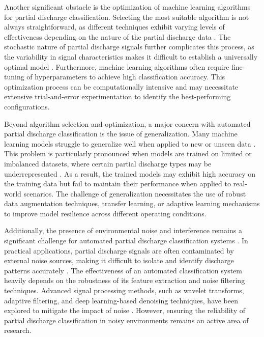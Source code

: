 Another significant obstacle is the optimization of machine learning algorithms for partial discharge classification. Selecting the most suitable algorithm is not always straightforward, as different techniques exhibit varying levels of effectiveness depending on the nature of the partial discharge data \parencite{Fei_2024}. The stochastic nature of partial discharge signals further complicates this process, as the variability in signal characteristics makes it difficult to establish a universally optimal model \parencite{Vigneshwaran_2022}. Furthermore, machine learning algorithms often require fine-tuning of hyperparameters to achieve high classification accuracy. This optimization process can be computationally intensive and may necessitate extensive trial-and-error experimentation to identify the best-performing configurations.

Beyond algorithm selection and optimization, a major concern with automated partial discharge classification is the issue of generalization. Many machine learning models struggle to generalize well when applied to new or unseen data \parencite{Raymond_2022}. This problem is particularly pronounced when models are trained on limited or imbalanced datasets, where certain partial discharge types may be underrepresented \parencite{Tuyet-Doan_2021}. As a result, the trained models may exhibit high accuracy on the training data but fail to maintain their performance when applied to real-world scenarios. The challenge of generalization necessitates the use of robust data augmentation techniques, transfer learning, or adaptive learning mechanisms to improve model resilience across different operating conditions.

Additionally, the presence of environmental noise and interference remains a significant challenge for automated partial discharge classification systems \parencite{Azam_2023}. In practical applications, partial discharge signals are often contaminated by external noise sources, making it difficult to isolate and identify discharge patterns accurately \parencite{Friebe_2024}. The effectiveness of an automated classification system heavily depends on the robustness of its feature extraction and noise filtering techniques. Advanced signal processing methods, such as wavelet transforms, adaptive filtering, and deep learning-based denoising techniques, have been explored to mitigate the impact of noise \parencite{Abdullah_2019, Jin_2019}. However, ensuring the reliability of partial discharge classification in noisy environments remains an active area of research.

